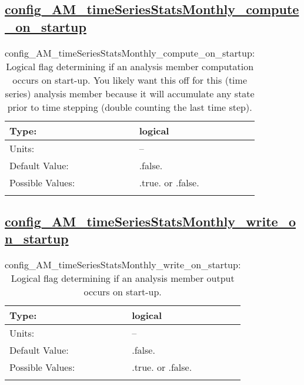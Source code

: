 \subsection[config\_AM\_timeSeriesStatsMonthly\_compute\_on\_startup]{\hyperref[sec:nm_tab_AM_timeSeriesStatsMonthly]{config\_AM\_timeSeriesStatsMonthly\_compute\_on\_startup}}
\label{subsec:nm_sec_config_AM_timeSeriesStatsMonthly_compute_on_startup}
\begin{center}
\begin{longtable}{| p{2.0in} || p{4.0in} |}
    \hline
    Type: & logical \\
    \hline
    Units: & -- \\
    \hline
    Default Value: & .false. \\
    \hline
    Possible Values: & .true. or .false. \\
    \hline
    \caption{config\_AM\_timeSeriesStatsMonthly\_compute\_on\_startup: Logical flag determining if an analysis member computation occurs on start-up. You likely want this off for this (time series) analysis member because it will accumulate any state prior to time stepping (double counting the last time step).}
\end{longtable}
\end{center}
\subsection[config\_AM\_timeSeriesStatsMonthly\_write\_on\_startup]{\hyperref[sec:nm_tab_AM_timeSeriesStatsMonthly]{config\_AM\_timeSeriesStatsMonthly\_write\_on\_startup}}
\label{subsec:nm_sec_config_AM_timeSeriesStatsMonthly_write_on_startup}
\begin{center}
\begin{longtable}{| p{2.0in} || p{4.0in} |}
    \hline
    Type: & logical \\
    \hline
    Units: & -- \\
    \hline
    Default Value: & .false. \\
    \hline
    Possible Values: & .true. or .false. \\
    \hline
    \caption{config\_AM\_timeSeriesStatsMonthly\_write\_on\_startup: Logical flag determining if an analysis member output occurs on start-up.}
\end{longtable}
\end{center}
